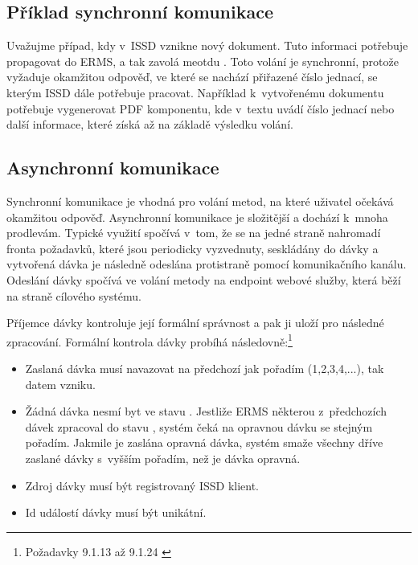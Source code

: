 \documentclass[
  master,
  field=ainfp,
  biblatex,
  language=czech,
  glossaries,
  theorems=false,
  index
]{kidiplom}
\begin{document}
\subsection{Příklad synchronní komunikace}
Uvažujme případ, kdy v~ISSD vznikne nový dokument. Tuto informaci potřebuje propagovat do ERMS, a tak zavolá meotdu . Toto volání je synchronní, protože vyžaduje okamžitou odpověď, ve které se nachází přiřazené číslo jednací, se kterým ISSD dále potřebuje pracovat. Například k~vytvořenému dokumentu potřebuje vygenerovat PDF komponentu, kde v~textu uvádí číslo jednací nebo další informace, které získá až na základě výsledku volání.


\subsection{Asynchronní komunikace}
\begin{table}
\begin{center}
\caption{Metody asynchronního rozhraní}\label{tab:ErmsAsync}
\end{center}
\end{table}

Synchronní komunikace je vhodná pro volání metod, na které uživatel očekává okamžitou odpověď. Asynchronní komunikace je složitější a dochází k~mnoha prodlevám. Typické využití spočívá v~tom, že se na jedné straně nahromadí fronta požadavků, které jsou periodicky vyzvednuty, seskládány do dávky a vytvořená dávka je následně odeslána protistraně pomocí komunikačního kanálu. Odeslání dávky spočívá ve volání metody  na endpoint webové služby, která běží na straně cílového systému.

Příjemce dávky kontroluje její formální správnost a pak ji uloží pro následné zpracování. Formální kontrola dávky probíhá následovně:\footnote{Požadavky 9.1.13 až 9.1.24 \cite[s.~63--64]{o00}}
\begin{itemize}\label{enum:prichoziDavka}
	\item Zaslaná dávka musí navazovat na předchozí jak pořadím (1,2,3,4,...), tak datem vzniku.
	\item Žádná dávka nesmí byt ve stavu . Jestliže ERMS některou z~předchozích dávek zpracoval do stavu , systém čeká na opravnou dávku se stejným pořadím. Jakmile je zaslána opravná dávka, systém smaže všechny dříve zaslané dávky s~vyšším pořadím, než je dávka opravná.
	\item Zdroj dávky musí být registrovaný ISSD klient.
	\item Id událostí dávky musí být unikátní.
\end{itemize}
 
\end{document}
